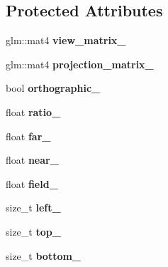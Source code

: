 \subsection*{\-Protected \-Attributes}
\begin{DoxyCompactItemize}
\item 
\hypertarget{classs9_1_1Camera_aa14bf0dbfe9f292b4841c647f328dd76}{glm\-::mat4 {\bfseries view\-\_\-matrix\-\_\-}}\label{classs9_1_1Camera_aa14bf0dbfe9f292b4841c647f328dd76}

\item 
\hypertarget{classs9_1_1Camera_aab7a588b390fa05250f25b5538e46b86}{glm\-::mat4 {\bfseries projection\-\_\-matrix\-\_\-}}\label{classs9_1_1Camera_aab7a588b390fa05250f25b5538e46b86}

\item 
\hypertarget{classs9_1_1Camera_a71665686599a0151fad513544fa21230}{bool {\bfseries orthographic\-\_\-}}\label{classs9_1_1Camera_a71665686599a0151fad513544fa21230}

\item 
\hypertarget{classs9_1_1Camera_a0344aaaadb55b0d81800b51f2c7b2815}{float {\bfseries ratio\-\_\-}}\label{classs9_1_1Camera_a0344aaaadb55b0d81800b51f2c7b2815}

\item 
\hypertarget{classs9_1_1Camera_a3756d83d24d11222efa0130e95ff903e}{float {\bfseries far\-\_\-}}\label{classs9_1_1Camera_a3756d83d24d11222efa0130e95ff903e}

\item 
\hypertarget{classs9_1_1Camera_a214dd980fd5f99f272e1aef1646e45e4}{float {\bfseries near\-\_\-}}\label{classs9_1_1Camera_a214dd980fd5f99f272e1aef1646e45e4}

\item 
\hypertarget{classs9_1_1Camera_a88cb54b968bf47fea6a536fba0ab52e8}{float {\bfseries field\-\_\-}}\label{classs9_1_1Camera_a88cb54b968bf47fea6a536fba0ab52e8}

\item 
\hypertarget{classs9_1_1Camera_aae3f13ab7467694c6b38175e1df84a76}{size\-\_\-t {\bfseries left\-\_\-}}\label{classs9_1_1Camera_aae3f13ab7467694c6b38175e1df84a76}

\item 
\hypertarget{classs9_1_1Camera_aff5887222b004435324ef1d37a2b20d6}{size\-\_\-t {\bfseries top\-\_\-}}\label{classs9_1_1Camera_aff5887222b004435324ef1d37a2b20d6}

\item 
\hypertarget{classs9_1_1Camera_a39f17ec5ca1d58c0e91c544f6aa4e38b}{size\-\_\-t {\bfseries bottom\-\_\-}}\label{classs9_1_1Camera_a39f17ec5ca1d58c0e91c544f6aa4e38b}


\end{DoxyCompactItemize}
